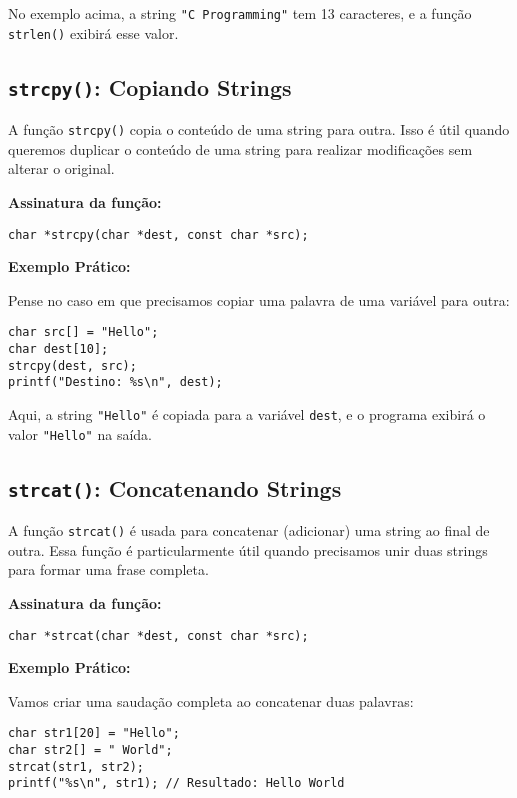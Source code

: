 \documentclass[12pt]{article}
\begin{document}
No exemplo acima, a string \texttt{"C Programming"} tem 13 caracteres, e a função \texttt{strlen()} exibirá esse valor.

\subsection{\texttt{strcpy()}: Copiando Strings}
A função \texttt{strcpy()} copia o conteúdo de uma string para outra. Isso é útil quando queremos duplicar o conteúdo de uma string para realizar modificações sem alterar o original.

\textbf{Assinatura da função:}

\begin{lstlisting}
char *strcpy(char *dest, const char *src);
\end{lstlisting}

\textbf{Exemplo Prático:}

Pense no caso em que precisamos copiar uma palavra de uma variável para outra:

\begin{lstlisting}
char src[] = "Hello";
char dest[10];
strcpy(dest, src);
printf("Destino: %s\n", dest);
\end{lstlisting}

Aqui, a string \texttt{"Hello"} é copiada para a variável \texttt{dest}, e o programa exibirá o valor \texttt{"Hello"} na saída.

\subsection{\texttt{strcat()}: Concatenando Strings}
A função \texttt{strcat()} é usada para concatenar (adicionar) uma string ao final de outra. Essa função é particularmente útil quando precisamos unir duas strings para formar uma frase completa.

\textbf{Assinatura da função:}

\begin{lstlisting}
char *strcat(char *dest, const char *src);
\end{lstlisting}

\textbf{Exemplo Prático:}

Vamos criar uma saudação completa ao concatenar duas palavras:

\begin{lstlisting}
char str1[20] = "Hello";
char str2[] = " World";
strcat(str1, str2);
printf("%s\n", str1); // Resultado: Hello World
\end{lstlisting}
\end{document}
